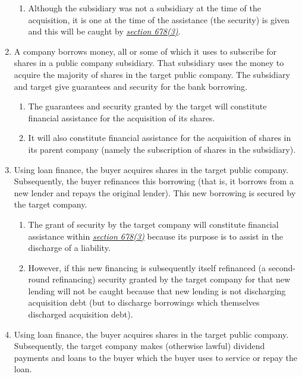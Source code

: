\documentclass[
]{article}
\providecommand{\tightlist}{%
  \setlength{\itemsep}{0pt}\setlength{\parskip}{0pt}}
\begin{document}
\begin{enumerate}
  \begin{enumerate}
  \tightlist
  \item
    Although the subsidiary was not a subsidiary at the time of the
    acquisition, it is one at the time of the assistance (the security)
    is given and this will be caught by
    \emph{\href{https://uk.westlaw.com/5-505-7258?originationContext=document\&transitionType=PLDocumentLink\&contextData=(sc.Default)\&ppcid=fc9f4d9e83af4b4c8d47bf5847a3205c}{section
    678(3)}}.
  \end{enumerate}
\item
  A company borrows money, all or some of which it uses to subscribe for
  shares in a public company subsidiary. That subsidiary uses the money
  to acquire the majority of shares in the target public company. The
  subsidiary and target give guarantees and security for the bank
  borrowing.

  \begin{enumerate}
  \tightlist
  \item
    The guarantees and security granted by the target will constitute
    financial assistance for the acquisition of its shares.
  \item
    It will also constitute financial assistance for the acquisition of
    shares in its parent company (namely the subscription of shares in
    the subsidiary).
  \end{enumerate}
\item
  Using loan finance, the buyer acquires shares in the target public
  company. Subsequently, the buyer refinances this borrowing (that is,
  it borrows from a new lender and repays the original lender). This new
  borrowing is secured by the target company.

  \begin{enumerate}
  \tightlist
  \item
    The grant of security by the target company will constitute
    financial assistance within
    \emph{\href{https://uk.westlaw.com/5-505-7258?originationContext=document\&transitionType=PLDocumentLink\&contextData=(sc.Default)\&ppcid=fc9f4d9e83af4b4c8d47bf5847a3205c}{section
    678(3)}} because its purpose is to assist in the discharge of a
    liability.
  \item
    However, if this new financing is subsequently itself refinanced (a
    second-round refinancing) security granted by the target company for
    that new lending will not be caught because that new lending is not
    discharging acquisition debt (but to discharge borrowings which
    themselves discharged acquisition debt).
  \end{enumerate}
\item
  Using loan finance, the buyer acquires shares in the target public
  company. Subsequently, the target company makes (otherwise lawful)
  dividend payments and loans to the buyer which the buyer uses to
  service or repay the loan.


\end{enumerate}
\end{document}

